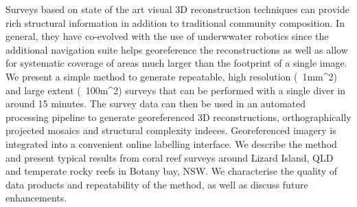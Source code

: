 Surveys based on state of the art visual 3D reconstruction techniques can provide rich structural information in addition to traditional community composition. In general, they have co-evolved with the use of underwwater robotics since the additional navigation suite helps georeference the reconstructions as well as allow for systematic coverage of areas much larger than the footprint of a single image. We present a simple method to generate repeatable, high resolution (~1mm^{2}) and large extent (~100m^{2}) surveys that can be performed with a single diver in around 15 minutes. The survey data can then be used in an automated processing pipeline to generate georeferenced 3D reconstructions, orthographically projected mosaics and structural complexity indeces. Georeferenced imagery is integrated into a convenient online labelling interface. 
We describe the method and present typical results from coral reef surveys around Lizard Island, QLD and temperate rocky reefs in Botany bay, NSW. We characterise the quality of data products and repeatability of the method, as well as discuss future enhancements.